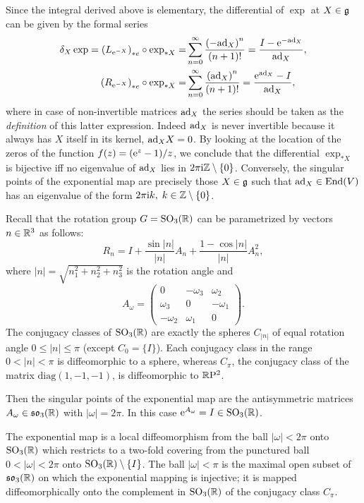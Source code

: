 \begin{rem}
    Since the integral derived above is elementary, the differential of $\exp$ at $X\in\mathfrak{g}$ can be given by the formal series
    \begin{align}
        \delta_X\exp= \left(L_{\mathrm{e}^{-X}}\right)_{\ast e}\circ \exp_{\ast X}=&\sum_{n=0}^\infty \frac{\left(-\mathrm{ad}_{X}\right)^n}{(n+1)!}=\frac{I-\mathrm{e}^{-\mathrm{ad}_X}}{\mathrm{ad}_X},\\
        \left(R_{\mathrm{e}^{-X}}\right)_{\ast e}\circ \exp_{\ast X}=&\sum_{n=0}^\infty \frac{\left(\mathrm{ad}_{X}\right)^n}{(n+1)!}=\frac{\mathrm{e}^{\mathrm{ad}_X}-I}{\mathrm{ad}_X},\label{dexp series}
    \end{align}
    where in case of non-invertible matrices $\mathrm{ad}_X$ the series should be taken as the \emph{definition} of this latter expression. Indeed $\mathrm{ad}_X$ is never invertible because it always has $X$ itself in its kernel, $\mathrm{ad}_X X=0$. By looking at the location of the zeros of the function $f(z)=(\mathrm{e}^z-1)/z$, we conclude that the differential $\exp_{\ast X}$ is bijective iff no eigenvalue of $\mathrm{ad}_X$ lies in $2\pi \mathrm{i}\mathbb{Z}\setminus\{0\}$. Conversely, the singular points of the exponential map are precisely those $X\in \mathfrak{g}$ such that $\mathrm{ad}_X\in \operatorname{End}(V)$ has an eigenvalue of the form $2\pi \mathrm{i} k,$ $k\in\mathbb{Z}\setminus\{0\}$.
\end{rem}

\begin{example}
    Recall that the rotation group $G=\operatorname{SO}_3(\mathbb{R})$ can be parametrized by vectors $n\in\mathbb{R}^3$ as follows:
    \[R_n=I+\frac{\sin |n|}{|n|}A_n+\frac{1-\cos |n|}{|n|}A_n^2,\]
    where $|n|=\sqrt{n_1^2+n_2^2+n_3^2}$ is the rotation angle and 
    \[A_\omega=\begin{pmatrix}
        0&-\omega_3&\omega_2\\
        \omega_3&0&-\omega_1\\
        -\omega_2&\omega_1&0
    \end{pmatrix}.\]
    The conjugacy classes of $\operatorname{SO}_3(\mathbb{R})$ are exactly the spheres $C_{|n|}$ of equal rotation angle $0\leq |n|\leq \pi$ (except $C_0=\{I\}$). Each conjugacy class in the range $0<|n|<\pi$ is diffeomorphic to a sphere, whereas $C_\pi$, the conjugacy class of the matrix $\mathrm{diag}(1,-1,-1)$, is diffeomorphic to $\mathbb{R}\mathrm{P}^2$.
    
    Then the singular points of the exponential map are the antisymmetric matrices $A_\omega\in \mathfrak{so}_3(\mathbb{R})$ with $|\omega|=2\pi$. In this case $\mathrm{e}^{A_\omega}=I\in \operatorname{SO}_3(\mathbb{R})$. 

    The exponential map is a local diffeomorphism from the ball $|\omega|<2\pi$ onto $\operatorname{SO}_3(\mathbb{R})$ which restricts to a two-fold covering from the punctured ball $0<|\omega|<2\pi$ onto $\operatorname{SO}_3(\mathbb{R})\setminus \{I\}$. The ball $|\omega|<\pi$ is the maximal open subset of $\mathfrak{so}_3(\mathbb{R})$ on which the exponential mapping is injective; it is mapped diffeomorphically onto the complement in $\operatorname{SO}_3(\mathbb{R})$ of the conjugacy class $C_\pi$.
\end{example}


